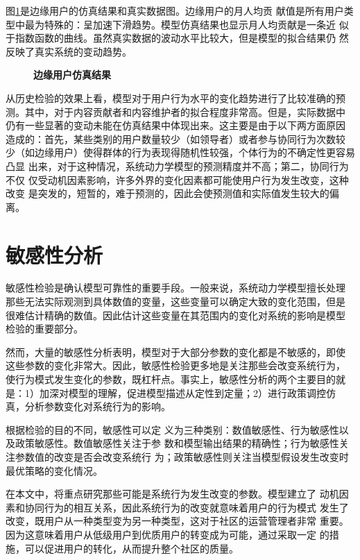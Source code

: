 图\ref{fig:simu5}是边缘用户的仿真结果和真实数据图。边缘用户的月人均贡
献值是所有用户类型中最为特殊的：呈加速下滑趋势。模型仿真结果也显示月人均贡献是一条近
似于指数函数的曲线。虽然真实数据的波动水平比较大，但是模型的拟合结果仍
然反映了真实系统的变动趋势。
\begin{figure}[!htb]
  \centering

  \caption{\small{\textbf{边缘用户仿真结果}}}
  \label{fig:simu5}
\end{figure}

从历史检验的效果上看，模型对于用户行为水平的变化趋势进行了比较准确的预
测。其中，对于内容贡献者和内容维护者的拟合程度非常高。但是，实际数据中
仍有一些显著的变动未能在仿真结果中体现出来。这主要是由于以下两方面原因
造成的：首先，某些类别的用户数量较少（如领导者）或者参与协同行为次数较
少（如边缘用户）使得群体的行为表现得随机性较强，个体行为的不确定性更容易凸显
出来，对于这种情况，系统动力学模型的预测精度并不高；第二，协同行为不仅
仅受动机因素影响，许多外界的变化因素都可能使用户行为发生改变，这种改变
是突发的，短暂的，难于预测的，因此会使预测值和实际值发生较大的偏离。

\section{敏感性分析}
\label{sec:sensitivity-test}
敏感性检验是确认模型可靠性的重要手段。一般来说，系统动力学模型擅长处理
那些无法实际观测到具体数值的变量，这些变量可以确定大致的变化范围，但是
很难估计精确的数值。因此估计这些变量在其范围内的变化对系统的影响是模型
检验的重要部分。

然而，大量的敏感性分析表明，模型对于大部分参数的变化都是不敏感的，即使
这些参数的变化非常大。因此，敏感性检验更多地是关注那些会改变系统行为，
使行为模式发生变化的参数，既杠杆点。事实上，敏感性分析的两个主要目的就
是：1）加深对模型的理解，促进模型描述从定性到定量；2）进行政策调控仿
真，分析参数变化对系统行为的影响。

根据检验的目的不同，敏感性可以定
义为三种类别：数值敏感性、行为敏感性以及政策敏感性。数值敏感性关注于参
数和模型输出结果的精确性；行为敏感性关注参数值的改变是否会改变系统行
为；政策敏感性则关注当模型假设发生改变时最优策略的变化情况。

在本文中，将重点研究那些可能是系统行为发生改变的参数。模型建立了
动机因素和协同行为的相互关系，因此系统行为的改变就意味着用户的行为模式
发生了改变，既用户从一种类型变为另一种类型，这对于社区的运营管理者非常
重要。因为这意味着用户从低级用户到优质用户的转变成为可能，通过采取一定
的措施，可以促进用户的转化，从而提升整个社区的质量。

